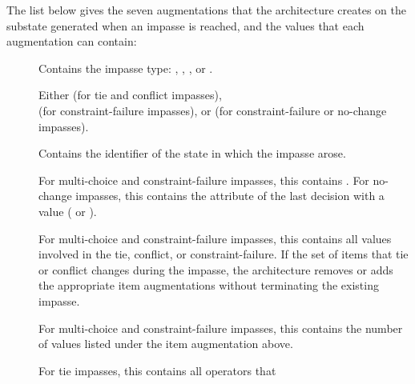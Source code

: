The list below gives the seven augmentations that the architecture creates on the
substate generated when an impasse is reached, and the
values that each augmentation can contain:

\vspace{-12pt}
\begin{description} 
\item [] 
	\vspace{-8pt} 
\item [] Contains the impasse type: 
	, , , or .
	\vspace{-8pt} 
\item []Either  (for tie and conflict impasses), 
	 \\ (for constraint-failure impasses), or 
	 (for constraint-failure or no-change impasses).
	\vspace{-8pt} 
\item [] Contains the identifier of the state in which 
	the impasse arose.
	\vspace{-8pt}
\item [] For multi-choice and constraint-failure impasses,
	this contains . For no-change impasses, this contains 
	the attribute of the last decision with a value ( or ).
	\vspace{-8pt}
\item [] For multi-choice and constraint-failure impasses, this 
	contains all values involved in the tie, conflict, or constraint-failure. 
	If the set of items that tie or conflict changes during the impasse, the architecture 
	removes or adds the appropriate item augmentations without terminating the existing impasse.
	\vspace{-8pt}
\item [] For multi-choice and constraint-failure impasses, this 
	contains the number of values listed under the item augmentation above.
	\vspace{-8pt}
\item [] For tie impasses, this contains all operators that

\end{description}
